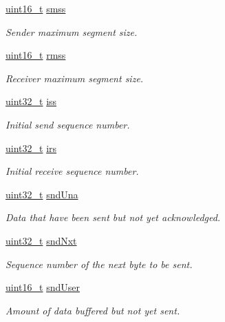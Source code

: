 \begin{DoxyCompactItemize}
\hyperlink{stdint_8h_a273cf69d639a59973b6019625df33e30}{uint16\+\_\+t} \hyperlink{struct__Socket_aea7a5830dae93a270575c42bf1ac7abd}{smss}
\begin{DoxyCompactList}\small\item\em Sender maximum segment size. \end{DoxyCompactList}\item 
\hyperlink{stdint_8h_a273cf69d639a59973b6019625df33e30}{uint16\+\_\+t} \hyperlink{struct__Socket_ab67196c9d6187c63435c02a65dc150bc}{rmss}
\begin{DoxyCompactList}\small\item\em Receiver maximum segment size. \end{DoxyCompactList}\item 
\hyperlink{stdint_8h_a435d1572bf3f880d55459d9805097f62}{uint32\+\_\+t} \hyperlink{struct__Socket_a4c01a6f4ddbdd45b9d1201c3e2c8f405}{iss}
\begin{DoxyCompactList}\small\item\em Initial send sequence number. \end{DoxyCompactList}\item 
\hyperlink{stdint_8h_a435d1572bf3f880d55459d9805097f62}{uint32\+\_\+t} \hyperlink{struct__Socket_ab21f9ea02604b1eeb6414658b62af555}{irs}
\begin{DoxyCompactList}\small\item\em Initial receive sequence number. \end{DoxyCompactList}\item 
\hyperlink{stdint_8h_a435d1572bf3f880d55459d9805097f62}{uint32\+\_\+t} \hyperlink{struct__Socket_a9bc2b30832c4f895ce58f5045353c710}{snd\+Una}
\begin{DoxyCompactList}\small\item\em Data that have been sent but not yet acknowledged. \end{DoxyCompactList}\item 
\hyperlink{stdint_8h_a435d1572bf3f880d55459d9805097f62}{uint32\+\_\+t} \hyperlink{struct__Socket_a208ad366ba441629645457c741a5352d}{snd\+Nxt}
\begin{DoxyCompactList}\small\item\em Sequence number of the next byte to be sent. \end{DoxyCompactList}\item 
\hyperlink{stdint_8h_a273cf69d639a59973b6019625df33e30}{uint16\+\_\+t} \hyperlink{struct__Socket_a06881f181115eff4f6d6739ae42c43bd}{snd\+User}
\begin{DoxyCompactList}\small\item\em Amount of data buffered but not yet sent. \end{DoxyCompactList}\item 

\end{DoxyCompactItemize}
